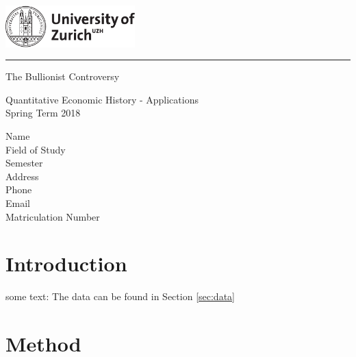 \documentclass[a4paper,12pt]{article}
\begin{document}
\begin{titlepage}

\noindent\includegraphics[width=5cm]{uzh_logo_e_pos.pdf}


\noindent\rule{\textwidth}{0.4pt}

\vspace{1cm}

  \begin{center}
    {\LARGE The Bullionist Controversy}

{\Large Quantitative Economic History - Applications\\Spring Term 2018}

  \end{center}

\vfill

{\flushleft
Name \\
Field of Study\\
Semester\\
Address\\
Phone\\
Email\\
Matriculation Number}  

\end{titlepage}



\pagebreak

\pagebreak
\section{Introduction}

some text: The data can be found in Section \ref{sec:data}

\section{Method}
\end{document}
